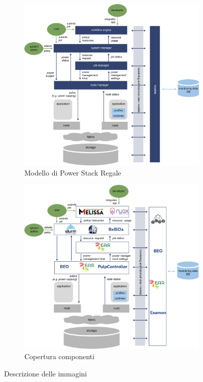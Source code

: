 \begin{figure}[htbp][H]
    \centering
    \begin{subfigure}[b]{0.7\textwidth}
    \includegraphics[width=\textwidth]{img/REGALE-Architecture-1536x1421.png}
    \caption{Modello di Power Stack Regale}
    \label{fig:powerstackscheme}
    \end{subfigure}
    \hfill
    \begin{subfigure}[b]{0.7\textwidth}
    \includegraphics[width=\textwidth]{img/REGALE_USE.png}
    \caption{Copertura componenti}
    \label{fig:regale_cover}
    \end{subfigure}
    \caption{Descrizione delle immagini}
\end{figure}

